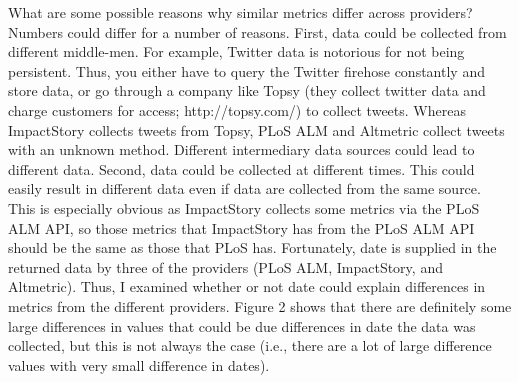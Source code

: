 \documentclass[letterpaper,superscriptaddress,showkeys,longbibliography]{revtex4-1}\usepackage{graphicx, color}
\begin{document}
What are some possible reasons why similar metrics differ across providers? Numbers could differ for a number of reasons. First, data could be collected from different middle-men. For example, Twitter data is notorious for not being persistent. Thus, you either have to query the Twitter firehose constantly and store data, or go through a company like Topsy (they collect twitter data and charge customers for access; http://topsy.com/) to collect tweets. Whereas ImpactStory collects tweets from Topsy, PLoS ALM and Altmetric collect tweets with an unknown method. Different intermediary data sources could lead to different data. Second, data could be collected at different times. This could easily result in different data even if data are collected from the same source. This is especially obvious as ImpactStory collects some metrics via the PLoS ALM API, so those metrics that ImpactStory has from the PLoS ALM API should be the same as those that PLoS has. Fortunately, date is supplied in the returned data by three of the providers (PLoS ALM, ImpactStory, and Altmetric). Thus, I examined whether or not date could explain differences in metrics from the different providers. Figure 2 shows that there are definitely some large differences in values that could be due differences in date the data was collected, but this is not always the case (i.e., there are a lot of large difference values with very small difference in dates). 
\end{document}
